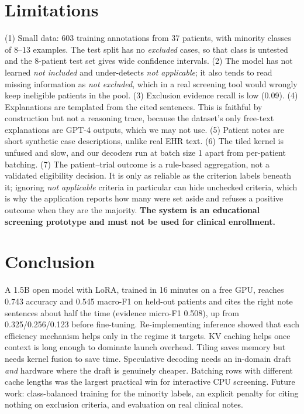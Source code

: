\documentclass[conference]{IEEEtran}
\begin{document}
\section{Limitations}
(1) Small data: 603 training annotations from 37 patients, with minority classes of 8--13 examples. The test split has no \emph{excluded} cases, so that class is untested and the 8-patient test set gives wide confidence intervals. (2) The model has not learned \emph{not included} and under-detects \emph{not applicable}; it also tends to read missing information as \emph{not excluded}, which in a real screening tool would wrongly keep ineligible patients in the pool. (3) Exclusion evidence recall is low (0.09). (4) Explanations are templated from the cited sentences. This is faithful by construction but not a reasoning trace, because the dataset's only free-text explanations are GPT-4 outputs, which we may not use. (5) Patient notes are short synthetic case descriptions, unlike real EHR text. (6) The tiled kernel is unfused and slow, and our decoders run at batch size 1 apart from per-patient batching. (7) The patient--trial outcome is a rule-based aggregation, not a validated eligibility decision. It is only as reliable as the criterion labels beneath it; ignoring \emph{not applicable} criteria in particular can hide unchecked criteria, which is why the application reports how many were set aside and refuses a positive outcome when they are the majority. \textbf{The system is an educational screening prototype and must not be used for clinical enrollment.}

\section{Conclusion}
A 1.5B open model with LoRA, trained in 16 minutes on a free GPU, reaches 0.743 accuracy and 0.545 macro-F1 on held-out patients and cites the right note sentences about half the time (evidence micro-F1 0.508), up from 0.325/0.256/0.123 before fine-tuning. Re-implementing inference showed that each efficiency mechanism helps only in the regime it targets. KV caching helps once context is long enough to dominate launch overhead. Tiling saves memory but needs kernel fusion to save time. Speculative decoding needs an in-domain draft \emph{and} hardware where the draft is genuinely cheaper. Batching rows with different cache lengths was the largest practical win for interactive CPU screening. Future work: class-balanced training for the minority labels, an explicit penalty for citing nothing on exclusion criteria, and evaluation on real clinical notes.
\end{document}
